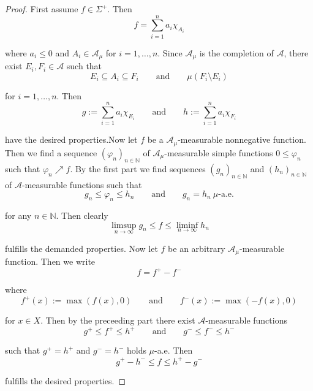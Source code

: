 \begin{proof}
	First assume $f \in \Sigma^+$. Then 
	\begin{equation}
		f = \sum_{i = 1}^n a_i \chi_{A_i}
	\end{equation}

	\noindent where $a_i \leq 0$ and $A_i \in \mathcal{A}_\mu$ for $i = 1,\dots,n$. Since $\mathcal{A}_\mu$ is the completion of $\mathcal{A}$, there exist $E_i,F_i \in \mathcal{A}$ such that 
	\begin{equation}
		E_i \subseteq A_i \subseteq F_i \qquad \text{and} \qquad \mu(F_i \setminus E_i)
	\end{equation}

	\noindent for $i = 1,\dots,n$. Then 
	\begin{equation}
		g := \sum_{i = 1}^n a_i \chi_{E_i} \qquad \text{and} \qquad h := \sum_{i = 1}^n a_i \chi_{F_i}
	\end{equation}

	\noindent have the desired properties.Now let $f$ be a $\mathcal{A}_\mu$-measurable nonnegative function. Then we find a sequence $(\varphi_n)_{n \in \mathbb{N}}$ of $\mathcal{A}_\mu$-measurable simple functions $0 \leq \varphi_n$ such that $\varphi_n \nearrow f$. By the first part we find sequences $(g_n)_{n\in\mathbb{N}}$ and $(h_n)_{n \in \mathbb{N}}$ of $\mathcal{A}$-measurable functions such that 
	\begin{equation}
		g_n \leq \varphi_n \leq h_n \qquad \text{and} \qquad g_n = h_n \>\mu\text{-a.e.}
	\end{equation}

	\noindent for any $n \in \mathbb{N}$. Then clearly 
	\begin{equation}
		\limsup_{n \to \infty} g_n \leq f \leq \liminf_{n \to \infty}h_n
	\end{equation}

	\noindent fulfills the demanded properties. Now let $f$ be an arbitrary $\mathcal{A}_\mu$-measurable function. Then we write 
	\begin{equation}
		f = f^+ - f^-
	\end{equation}

	\noindent where
	\begin{equation}
		f^+(x) := \max(f(x),0) \qquad \text{and} \qquad f^-(x) := \max(-f(x),0)
	\end{equation}

	\noindent for $x \in X$. Then by the preceeding part there exist $\mathcal{A}$-measurable functions
	\begin{equation}
		g^+ \leq f^+ \leq h^+ \qquad \text{and} \qquad g^- \leq f^- \leq h^-
	\end{equation}

	\noindent such that $g^+ = h^+$ and $g^- = h^-$ holds $\mu$-a.e. Then 
	\begin{equation}
		g^+ - h^- \leq f \leq h^+ - g^-
	\end{equation}

	\noindent fulfills the desired properties.
\end{proof}

